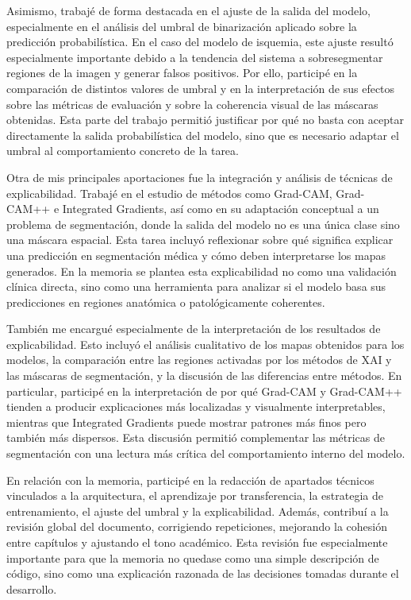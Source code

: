 Asimismo, trabajé de forma destacada en el ajuste de la salida del modelo, especialmente en el análisis del umbral de binarización aplicado sobre la predicción probabilística. En el caso del modelo de isquemia, este ajuste resultó especialmente importante debido a la tendencia del sistema a sobresegmentar regiones de la imagen y generar falsos positivos. Por ello, participé en la comparación de distintos valores de umbral y en la interpretación de sus efectos sobre las métricas de evaluación y sobre la coherencia visual de las máscaras obtenidas. Esta parte del trabajo permitió justificar por qué no basta con aceptar directamente la salida probabilística del modelo, sino que es necesario adaptar el umbral al comportamiento concreto de la tarea.

Otra de mis principales aportaciones fue la integración y análisis de técnicas de explicabilidad. Trabajé en el estudio de métodos como Grad-CAM, Grad-CAM++ e Integrated Gradients, así como en su adaptación conceptual a un problema de segmentación, donde la salida del modelo no es una única clase sino una máscara espacial. Esta tarea incluyó reflexionar sobre qué significa explicar una predicción en segmentación médica y cómo deben interpretarse los mapas generados. En la memoria se plantea esta explicabilidad no como una validación clínica directa, sino como una herramienta para analizar si el modelo basa sus predicciones en regiones anatómica o patológicamente coherentes.

También me encargué especialmente de la interpretación de los resultados de explicabilidad. Esto incluyó el análisis cualitativo de los mapas obtenidos para los modelos, la comparación entre las regiones activadas por los métodos de XAI y las máscaras de segmentación, y la discusión de las diferencias entre métodos. En particular, participé en la interpretación de por qué Grad-CAM y Grad-CAM++ tienden a producir explicaciones más localizadas y visualmente interpretables, mientras que Integrated Gradients puede mostrar patrones más finos pero también más dispersos. Esta discusión permitió complementar las métricas de segmentación con una lectura más crítica del comportamiento interno del modelo.

En relación con la memoria, participé en la redacción de apartados técnicos vinculados a la arquitectura, el aprendizaje por transferencia, la estrategia de entrenamiento, el ajuste del umbral y la explicabilidad. Además, contribuí a la revisión global del documento, corrigiendo repeticiones, mejorando la cohesión entre capítulos y ajustando el tono académico. Esta revisión fue especialmente importante para que la memoria no quedase como una simple descripción de código, sino como una explicación razonada de las decisiones tomadas durante el desarrollo.

